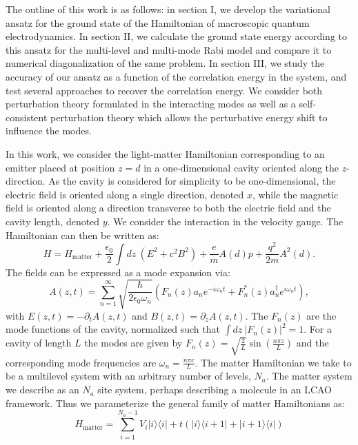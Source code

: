 \documentclass[aps,prb,twocolumn,
	groupedaddress,superscriptaddress,
	amsfonts,amssymb,amsmath,floatfix,
	citeautoscript]{revtex4-1}
\begin{document}
The outline of this work is as follows: in section I, we develop the variational ansatz for the ground state of the Hamiltonian of macroscopic quantum electrodynamics. In section II, we calculate the ground state energy according to this ansatz for the multi-level and multi-mode Rabi model and compare it to numerical diagonalization of the same problem. In section III, we study the accuracy of our ansatz as a function of the correlation energy in the system, and test several approaches to recover the correlation energy.  We consider both perturbation theory formulated in the interacting modes as well as a self-consistent perturbation theory which allows the perturbative energy shift to influence the modes.


In this work, we consider the light-matter Hamiltonian corresponding to an emitter placed at position $z=d$ in a one-dimensional cavity oriented along the $z$-direction. As the cavity is considered for simplicity to be one-dimensional, the electric field is oriented along a single direction, denoted $x$, while the magnetic field is oriented along a direction transverse to both the electric field and the cavity length, denoted $y$. We consider the interaction in the velocity gauge. The Hamiltonian can then be written as:
\begin{equation}
H = H_{\text{matter}}+\frac{\epsilon_0}{2}\int dz~(E^2+c^2B^2)+\frac{e}{m}A(d)p + \frac{q^2}{2m}A^2(d).
\end{equation}
The fields can be expressed as a mode expansion via:
\begin{equation}
A(z,t) = \sum\limits_{n=1}^{\infty} \sqrt{\frac{\hbar}{2\epsilon_0\omega_n }}(F_n(z)a_ne^{-i\omega_n t}+F^*_n(z)a_n^{\dagger}e^{i\omega_n t}),
\end{equation}
with $E(z,t) = -\partial_t A(z,t)$ and $B(z,t)=\partial_z A(z,t)$.  The $F_n(z)$ are the mode functions of the cavity, normalized such that $\int dz ~|F_n(z)|^2 = 1$. For a cavity of length $L$ the modes are given by $F_n(z) = \sqrt{\frac{2}{L}}\sin\left(\frac{n\pi z}{L} \right)$ and the corresponding mode frequencies are $\omega_n = \frac{n\pi c}{L}$. The matter Hamiltonian we take to be a multilevel system with an arbitrary number of levels, $N_a$. The matter system we describe as an $N_a$ site system, perhaps describing a molecule in an LCAO framework. Thus we parameterize the general family of matter Hamiltonians as:
\begin{equation}
H_{\text{matter}} = \sum\limits_{i=1}^{{N_a-1}} V_i|i\rangle\langle i|+t(|i\rangle\langle i+1|+|i+1\rangle\langle i|) 
\end{equation}
\end{document}
